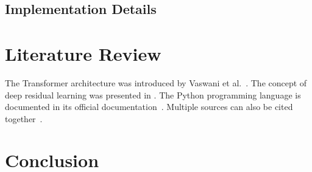 \documentclass[12pt,a4paper]{article}
\newif\ifshowbibliography
\begin{document}
\lipsum[10]

\subsection{Implementation Details}

\lipsum[11]



\section{Literature Review}

The Transformer architecture was introduced
by Vaswani et al.~\cite{vaswani2017attention}. The concept of deep residual learning
was presented in \cite{he2016deep}. The Python programming language is
documented in its official
documentation~\cite{python_docs}. Multiple sources can also be cited
together~\cite{vaswani2017attention,he2016deep}.




\section{Conclusion}

\lipsum[13]



\ifshowbibliography
    \clearpage
    \printbibliography[
        heading=bibintoc,
        title={References}
    ]
\fi
\end{document}
